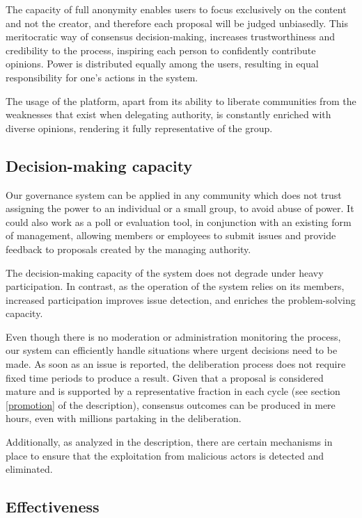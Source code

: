 \documentclass[a4paper,11pt]{article}
\begin{document}
\begin{multicols}{2}
The capacity of full anonymity enables users to focus exclusively on the content and not the creator, and therefore each proposal will be judged unbiasedly. This meritocratic way of consensus decision-making, increases trustworthiness and credibility to the process, inspiring each person to confidently contribute opinions. Power is distributed equally among the users, resulting in equal responsibility for one's actions in the system. 

The usage of the platform, apart from its ability to liberate communities from the weaknesses that exist when delegating authority, is constantly enriched with diverse opinions, rendering it fully representative of the group.

\subsection{Decision-making capacity} \label{capacity}

Our governance system can be applied in any community which does not trust assigning the power to an individual or a small group, to avoid abuse of power. It could also work as a poll or evaluation tool, in conjunction with an existing form of management, allowing members or employees to submit issues and provide feedback to proposals created by the managing authority.

The decision-making capacity of the system does not degrade under heavy participation. In contrast, as the operation of the system relies on its members, increased participation improves issue detection, and enriches the problem-solving capacity.

Even though there is no moderation or administration monitoring the process, our system can efficiently handle situations where urgent decisions need to be made. As soon as an issue is reported, the deliberation process does not require fixed time periods to produce a result. Given that a proposal is considered mature and is supported by a representative fraction in each cycle (see section \ref{promotion} of the description), consensus outcomes can be produced in mere hours, even with millions partaking in the deliberation.

Additionally, as analyzed in the description, there are certain mechanisms in place to ensure that the exploitation from malicious actors is detected and eliminated.

\subsection{Effectiveness} \label{effectiveness}


\end{multicols}
\end{document}
